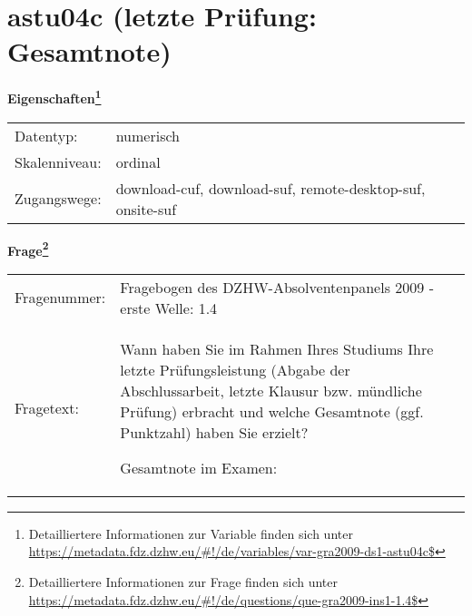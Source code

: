 
    \setcounter{footnote}{0}

    \vspace*{-1.8cm}
	\section{astu04c (letzte Prüfung: Gesamtnote)}
	\label{section:astu04c}



    \vspace*{0.5cm}
    \noindent\textbf{Eigenschaften\footnote{Detailliertere Informationen zur Variable finden sich unter
		\url{https://metadata.fdz.dzhw.eu/\#!/de/variables/var-gra2009-ds1-astu04c$}}}\\
	\begin{tabularx}{\hsize}{@{}lX}
	Datentyp: & numerisch \\
	Skalenniveau: & ordinal \\
	Zugangswege: &
	  download-cuf, 
	  download-suf, 
	  remote-desktop-suf, 
	  onsite-suf
 \\
    \end{tabularx}



				\vspace*{0.5cm}
                \noindent\textbf{Frage\footnote{Detailliertere Informationen zur Frage finden sich unter
		              \url{https://metadata.fdz.dzhw.eu/\#!/de/questions/que-gra2009-ins1-1.4$}}}\\
				\begin{tabularx}{\hsize}{@{}lX}
					Fragenummer: &
					  Fragebogen des DZHW-Absolventenpanels 2009 - erste Welle:
					  1.4
 \\
					Fragetext: & Wann haben Sie im Rahmen Ihres Studiums Ihre letzte Prüfungsleistung (Abgabe der Abschlussarbeit, letzte Klausur bzw. mündliche Prüfung) erbracht und welche Gesamtnote (ggf. Punktzahl) haben Sie erzielt?\par  Gesamtnote im Examen: \\
				\end{tabularx}





